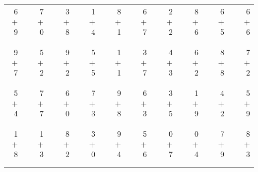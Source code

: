 \documentclass[12pt, letterpaper]{article}
\begin{document}
\begin{tabular}{rrrrrrrrrrrrrrrrrrr}
6 & & 7 & & 3 & & 1 & & 8 & & 6 & & 2 & & 8 & & 6 & & 6\\
$+$ 9 & & $+$ 0 & & $+$ 8 & & $+$ 4 & & $+$ 1 & & $+$ 7 & & $+$ 2 & & $+$ 6 & & $+$ 5 & & $+$ 6\\
\cline{1-1} \cline{3-3} \cline{5-5} \cline{7-7} \cline{9-9} \cline{11-11} \cline{13-13} \cline{15-15} \cline{17-17} \cline{19-19} \\ \\
9 & & 5 & & 9 & & 5 & & 1 & & 3 & & 4 & & 6 & & 8 & & 7\\
$+$ 7 & & $+$ 2 & & $+$ 2 & & $+$ 5 & & $+$ 1 & & $+$ 7 & & $+$ 3 & & $+$ 2 & & $+$ 8 & & $+$ 2\\
\cline{1-1} \cline{3-3} \cline{5-5} \cline{7-7} \cline{9-9} \cline{11-11} \cline{13-13} \cline{15-15} \cline{17-17} \cline{19-19} \\ \\
5 & & 7 & & 6 & & 7 & & 9 & & 6 & & 3 & & 1 & & 4 & & 5\\
$+$ 4 & & $+$ 7 & & $+$ 0 & & $+$ 3 & & $+$ 8 & & $+$ 3 & & $+$ 5 & & $+$ 9 & & $+$ 2 & & $+$ 9\\
\cline{1-1} \cline{3-3} \cline{5-5} \cline{7-7} \cline{9-9} \cline{11-11} \cline{13-13} \cline{15-15} \cline{17-17} \cline{19-19} \\ \\
1 & & 1 & & 8 & & 3 & & 9 & & 5 & & 0 & & 0 & & 7 & & 8\\
$+$ 8 & & $+$ 3 & & $+$ 2 & & $+$ 0 & & $+$ 4 & & $+$ 6 & & $+$ 7 & & $+$ 4 & & $+$ 9 & & $+$ 3\\
\cline{1-1} \cline{3-3} \cline{5-5} \cline{7-7} \cline{9-9} \cline{11-11} \cline{13-13} \cline{15-15} \cline{17-17} \cline{19-19} \\ \\
\end{tabular}
\newpage
\end{document}
